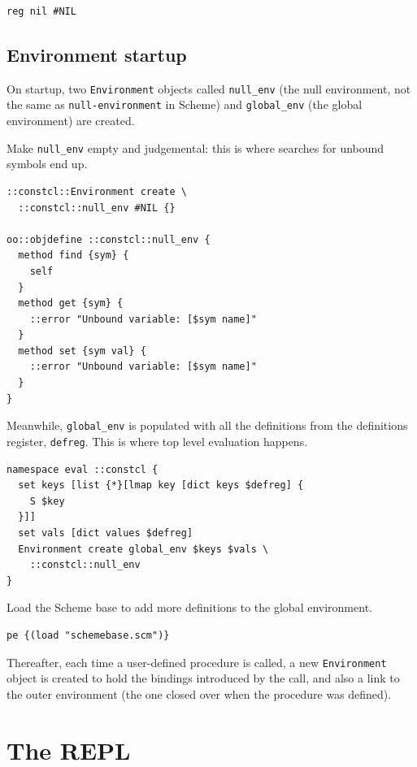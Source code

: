 \documentclass[twoside,9pt]{report}
\begin{document}
\begin{lstlisting}
reg nil #NIL
\end{lstlisting}
\section{Environment startup}
\label{environment-startup}


On startup, two \texttt{Environment} objects called \texttt{null\_env} (the null environment, not the same as \texttt{null-environment} in Scheme) and \texttt{global\_env} (the global environment) are created.


Make \texttt{null\_env} empty and judgemental: this is where searches for unbound symbols end up.

\begin{lstlisting}
::constcl::Environment create \
  ::constcl::null_env #NIL {}
 
oo::objdefine ::constcl::null_env {
  method find {sym} {
    self
  }
  method get {sym} {
    ::error "Unbound variable: [$sym name]"
  }
  method set {sym val} {
    ::error "Unbound variable: [$sym name]"
  }
}
\end{lstlisting}


Meanwhile, \texttt{global\_env} is populated with all the definitions from the definitions register, \texttt{defreg}. This is where top level evaluation happens.

\begin{lstlisting}
namespace eval ::constcl {
  set keys [list {*}[lmap key [dict keys $defreg] {
    S $key
  }]]
  set vals [dict values $defreg]
  Environment create global_env $keys $vals \
    ::constcl::null_env
}
\end{lstlisting}


Load the Scheme base to add more definitions to the global environment.

\index{schemebase}
\begin{lstlisting}
pe {(load "schemebase.scm")}
\end{lstlisting}


Thereafter, each time a user-defined procedure is called, a new \texttt{Environment} object is created to hold the bindings introduced by the call, and also a link to the outer environment (the one closed over when the procedure was defined).

\chapter{The REPL}
\label{the-repl}
\end{document}
